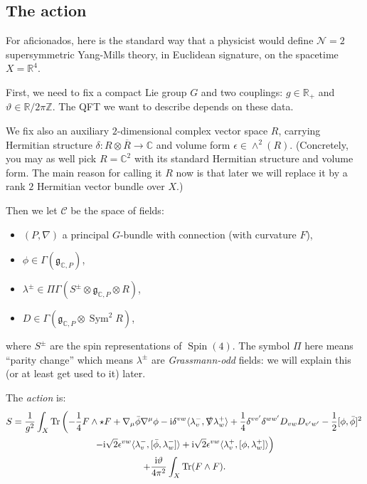 \documentclass[12pt,letterpaper,reqno]{article}
\numberwithin{equation}{section}
\newcommand{\fg}{{\mathfrak g}}
\newcommand{\cC}{\ensuremath{\mathcal C}}
\newcommand{\R}{\ensuremath{\mathbb R}}
\newcommand{\C}{\ensuremath{\mathbb C}}
\newcommand{\Z}{\ensuremath{\mathbb Z}}
\newcommand{\half}{\ensuremath{\frac{1}{2}}}
\newcommand{\N}{{\mathcal N}}
\newcommand{\I}{{\mathrm i}}
\newcommand{\IP}[1]{\langle#1\rangle}
\newcommand{\eps}{\epsilon}
\newcommand{\ti}[1]{\textit{#1}}
\DeclareMathOperator{\Tr}{Tr}
\DeclareMathOperator{\Sym}{Sym}
\DeclareMathOperator{\Spin}{Spin}
\newcommand{\fixme}[1]{{\color{orange}{[#1]}}}
\begin{document}
\subsection{The action} \label{sec:intro-action}

For aficionados, here is
the standard way that a physicist would define
$\N=2$ supersymmetric Yang-Mills theory, in Euclidean signature,
on the spacetime $X = \R^4$.

First, we need to fix a compact Lie group $G$ and two couplings: $g \in \R_+$ and
$\vartheta \in \R / 2 \pi \Z$. The QFT we want to describe depends on these
data.

We fix also an auxiliary $2$-dimensional complex vector space $R$, carrying
Hermitian structure $\delta: R \otimes \overline R \to \C$
and volume form $\eps \in \wedge^2(R)$. (Concretely, you may as well pick
$R = \C^2$ with its standard Hermitian structure and volume form. The main reason for
calling it $R$ now is that later we will replace it by a rank $2$ Hermitian
vector bundle over $X$.)

Then we let $\cC$ be the space of fields:
\begin{itemize}
\item $(P,\nabla)$ a principal $G$-bundle with connection (with curvature $F$),
\item $\phi \in \Gamma(\fg_{\C,P})$,
\item $\lambda^\pm \in \Pi \Gamma(S^\pm \otimes \fg_{\C,P} \otimes R)$,
\item $D \in \Gamma(\fg_{\C,P} \otimes \Sym^2 R)$,
\end{itemize}
where $S^\pm$ are the spin representations of $\Spin(4)$. The symbol $\Pi$ here means ``parity change''
which means $\lambda^\pm$ are \ti{Grassmann-odd} fields: we will explain this (or at least get used to it)
later.

The \ti{action} is: \fixme{explain notation $v$, $w$ and inner product $\IP{,}$, and double-check factors}
\begin{multline} \label{eq:n=2sym-action}
 S = \frac{1}{g^2} \int_X \Tr\left( - \frac14 F \wedge \star F + \nabla_\mu \bar\phi \nabla^\mu \phi - \I \delta^{vw} \IP{\lambda_v^-, \slashed\nabla \lambda_w^+} + \frac14 \delta^{vv'} \delta^{ww'} D_{vw} D_{v'w'} - \half [\phi, \bar\phi]^2 \right. \\ \left. - \I \sqrt{2} \eps^{vw} \IP{\lambda_v^-, [\bar\phi, \lambda_w^-]} + \I \sqrt{2} \eps^{vw} \IP{\lambda_v^+, [\phi,\lambda_w^+]} \right) \\ + \frac{\I \vartheta}{4\pi^2} \int_X \Tr (F \wedge F).
\end{multline}
\end{document}
